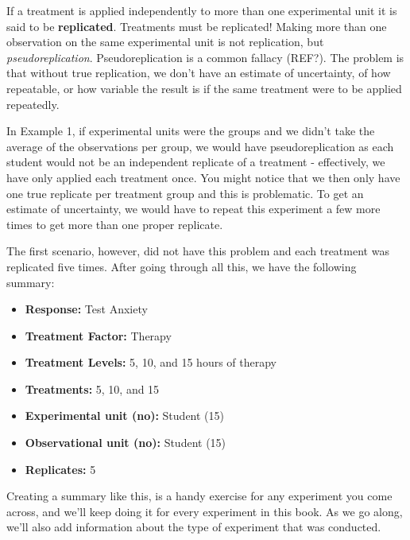\documentclass[
  letterpaper,
  DIV=11,
  numbers=noendperiod,
  oneside]{scrreprt}
\providecommand{\tightlist}{%
  \setlength{\itemsep}{0pt}\setlength{\parskip}{0pt}}\usepackage{longtable,booktabs,array}
\begin{document}

If a treatment is applied independently to more than one experimental
unit it is said to be \textbf{replicated}. Treatments must be
replicated! Making more than one observation on the same experimental
unit is not replication, but \emph{pseudoreplication}. Pseudoreplication
is a common fallacy (REF?). The problem is that without true
replication, we don't have an estimate of uncertainty, of how
repeatable, or how variable the result is if the same treatment were to
be applied repeatedly.

In Example 1, if experimental units were the groups and we didn't take
the average of the observations per group, we would have
pseudoreplication as each student would not be an independent replicate
of a treatment - effectively, we have only applied each treatment once.
You might notice that we then only have one true replicate per treatment
group and this is problematic. To get an estimate of uncertainty, we
would have to repeat this experiment a few more times to get more than
one proper replicate.

The first scenario, however, did not have this problem and each
treatment was replicated five times. After going through all this, we
have the following summary:

\begin{itemize}
\tightlist
\item
  \textbf{Response:} Test Anxiety\\
\item
  \textbf{Treatment Factor:} Therapy\\
\item
  \textbf{Treatment Levels:} 5, 10, and 15 hours of therapy\\
\item
  \textbf{Treatments:} 5, 10, and 15\\
\item
  \textbf{Experimental unit (no):} Student (15)\\
\item
  \textbf{Observational unit (no):} Student (15)\\
\item
  \textbf{Replicates:} 5
\end{itemize}

\begin{tcolorbox}[enhanced jigsaw, toprule=.15mm, colbacktitle=quarto-callout-tip-color!10!white, toptitle=1mm, left=2mm, colframe=quarto-callout-tip-color-frame, bottomrule=.15mm, titlerule=0mm, breakable, opacitybacktitle=0.6, colback=white, coltitle=black, opacityback=0, bottomtitle=1mm, title=\textcolor{quarto-callout-tip-color}{\faLightbulb}\hspace{0.5em}{Tip}, rightrule=.15mm, arc=.35mm, leftrule=.75mm]

Creating a summary like this, is a handy exercise for any experiment you
come across, and we'll keep doing it for every experiment in this book.
As we go along, we'll also add information about the type of experiment
that was conducted.

\end{tcolorbox}
\end{document}
